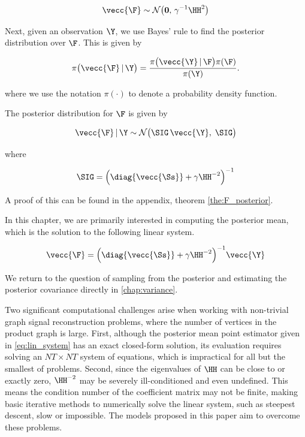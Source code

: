 \begin{equation}
    \label{eq:F_prior}
    \vecc{\F} \sim \mathcal{N}\big(\mathbf{0}, \, \gamma^{-1} \HH^2\big)
\end{equation}

Next, given an observation $\Y$, we use Bayes' rule to find the posterior distribution over $\F$. This is given by

\begin{equation}
    \pi\big(\vecc{\F} \, | \, \Y \big) = \frac{\pi\big(\vecc{\Y} \, | \, \F \big) \pi(\F) }{\pi(\Y)}.
\end{equation}

where we use the notation $\pi(\cdot)$ to denote a probability density function.

The posterior distribution for $\F$ is given by

\begin{equation}
    \label{eq:F_post}
    \vecc{\F} \, | \, \Y \sim \mathcal{N} \big(\SIG \, \vecc{\Y}, \; \SIG \big)
\end{equation}

\noindent where

\begin{equation}
    \label{eq:Sig_post}
    \SIG = \Big(\diag{\vecc{\Ss}} + \gamma  \HH^{-2}\Big)^{-1}
\end{equation}

A proof of this can be found in the appendix, theorem \ref{the:F_posterior}.



In this chapter, we are primarily interested in computing the posterior mean, which is the solution to the following linear system.

\begin{equation}
    \label{eq:lin_system}
    \vecc{\F} = \Big(\diag{\vecc{\Ss}} + \gamma  \HH^{-2}\Big)^{-1} \vecc{\Y}
\end{equation}

We return to the question of sampling from the posterior and estimating the posterior covariance directly in \cref{chap:variance}.

Two significant computational challenges arise when working with non-trivial graph signal reconstruction problems, where the number of vertices in the product graph is large. First, although the posterior mean point estimator given in \cref{eq:lin_system} has an exact closed-form solution, its evaluation requires solving an $NT \times NT$ system of equations, which is impractical for all but the smallest of problems. Second, since the eigenvalues of $\HH$ can be close to or exactly zero, $\HH^{-2}$ may be severely ill-conditioned and even undefined. This means the condition number of the coefficient matrix may not be finite, making basic iterative methods to numerically solve the linear system, such as steepest descent, slow or impossible. The models proposed in this paper aim to overcome these problems.



